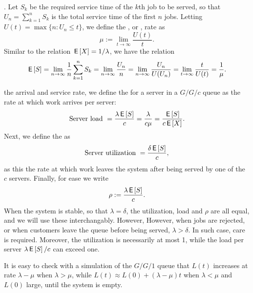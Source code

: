 .
Let $S_k$ be the required service time of the $k$th job to be served, so that $U_n = \sum_{k=1}^n S_k$ is the total service time of the first $n$ jobs.
Letting $ U(t) = \max\{n: U_n \leq t\}$, we define the , or , rate as
\begin{equation*}
 \mu := \lim_{t\to\infty} \frac{U(t)}t.
\end{equation*}
Similar to the relation  $\,\mathsf{E}\left[X\right]= 1/\lambda$, we have the relation
\begin{equation*}
 \,\mathsf{E}\left[S\right] = \lim_{n\to\infty} \frac 1 n \sum_{k=1}^n S_k = \lim_{n\to\infty} \frac{U_n}{n} = \lim_{n\to\infty} \frac{U_n}{U(U_n)} = \lim_{t\to\infty} \frac t{U(t)} = \frac 1 \mu.
\end{equation*}




 the arrival and service rate, we define the  for a server in a $G/G/c$ queue as  the rate at which work arrives per server:
\begin{equation*}
\textrm{Server load } =  \frac{\lambda \,\mathsf{E}\left[S\right]}c =\frac{\lambda}{c \mu} = \frac{\,\mathsf{E}\left[S\right]}{c \,\mathsf{E}\left[X\right]}.
\end{equation*}
Next, we define the  as
\begin{equation}\label{eq:6}
\textrm{Server utilization } = \frac{\delta \,\mathsf{E}\left[S\right]}{c},
\end{equation}
as this the rate at which work leaves the system after being served by one of the~$c$ servers.
Finally, for ease we write
\begin{equation*}
\rho := \frac{\lambda \,\mathsf{E}\left[S\right]} c.
\end{equation*}
When the system is stable, so that $\lambda=\delta$,   the utilization, load and $\rho$ are all equal, and we will use these interchangably. However,
However, when jobs are rejected, or when customers leave the queue before being served, $\lambda > \delta$. In such case, care is required.
Moreover, the utilization is necessarily at most 1, while the load per server $\lambda \,\mathsf{E}\left[S\right] /c$ can exceed one.

It is easy to check  with a simulation of the $G/G/1$ queue that $L(t)$ increases at rate $\lambda-\mu$ when $\lambda > \mu$, while $L(t) \approx L(0) + (\lambda - \mu)t$ when $\lambda< \mu$ and $L(0)$ large, until the system is empty.

